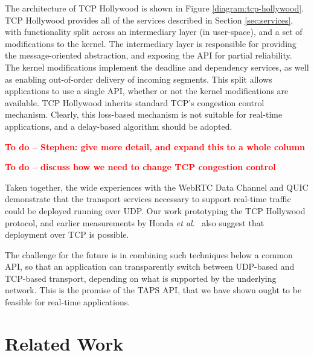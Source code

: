\documentclass{sig-alternate-05-2015}
\newcommand{\todo}[1]{\textbf{\textcolor{red}{To do -- #1}}}
\begin{document}
The architecture of TCP Hollywood is shown in
Figure \ref{diagram:tcp-hollywood}. TCP Hollywood provides all of the
services described in Section \ref{sec:services}, with functionality split
across an intermediary layer (in user-space), and a set of modifications to
the kernel. The intermediary layer is responsible for providing the
message-oriented abstraction, and exposing the API for partial reliability.
The kernel modifications implement the deadline and dependency services,
as well as enabling out-of-order delivery of incoming segments. This split
allows applications to use a single API, whether or not the kernel
modifications are available. TCP Hollywood inherits standard TCP's
congestion control mechanism. Clearly, this loss-based mechanism is not
suitable for real-time applications, and a delay-based algorithm should
be adopted.

\todo{Stephen: give more detail, and expand this to a whole column}

\todo{discuss how we need to change TCP congestion control}

Taken together, the wide experiences with the WebRTC Data Channel and QUIC
demonstrate that the transport services necessary to support real-time
traffic could be deployed running over UDP. Our work prototyping the TCP
Hollywood protocol, and earlier measurements by Honda \emph{et al}.\
\cite{honda:2011:extend-tcp} also suggest that deployment over TCP is
possible.

The challenge for the future is in combining such techniques below a common
API, so that an application can transparently switch between UDP-based and
TCP-based transport, depending on what is supported by the underlying
network. This is the promise of the TAPS API, that we have shown ought to
be feasible for real-time applications.

\section{Related Work}
\label{sec:related}

%
% 
\end{document}

